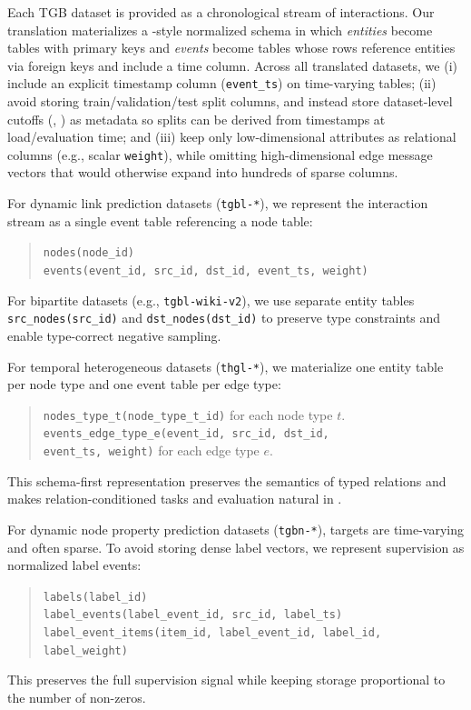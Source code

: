 Each TGB dataset is provided as a chronological stream of interactions. Our translation materializes a \relbench-style normalized schema in which \emph{entities} become tables with primary keys and \emph{events} become tables whose rows reference entities via foreign keys and include a time column. Across all translated datasets, we (i) include an explicit timestamp column (\texttt{event\_ts}) on time-varying tables; (ii) avoid storing train/validation/test split columns, and instead store dataset-level cutoffs (\valtimestamp, \testtimestamp) as metadata so splits can be derived from timestamps at load/evaluation time; and (iii) keep only low-dimensional attributes as relational columns (e.g., scalar \texttt{weight}), while omitting high-dimensional edge message vectors that would otherwise expand into hundreds of sparse columns.

For dynamic link prediction datasets (\texttt{tgbl-*}), we represent the interaction stream as a single event table referencing a node table:
\begin{quote}
  \small
  \texttt{nodes(node\_id)}\\
  \texttt{events(event\_id, src\_id, dst\_id, event\_ts, weight)}
\end{quote}
\noindent For bipartite datasets (e.g., \texttt{tgbl-wiki-v2}), we use separate entity tables \texttt{src\_nodes(src\_id)} and \texttt{dst\_nodes(dst\_id)} to preserve type constraints and enable type-correct negative sampling.

For temporal heterogeneous datasets (\texttt{thgl-*}), we materialize one entity table per node type and one event table per edge type:
\begin{quote}
  \small
  \texttt{nodes\_type\_t(node\_type\_t\_id)} for each node type \(t\).\\
  \texttt{events\_edge\_type\_e(event\_id, src\_id, dst\_id,}\\
  \texttt{event\_ts, weight)} for each edge type \(e\).
\end{quote}
\noindent This schema-first representation preserves the semantics of typed relations and makes relation-conditioned tasks and evaluation natural in \relbench.

For dynamic node property prediction datasets (\texttt{tgbn-*}), targets are time-varying and often sparse. To avoid storing dense label vectors, we represent supervision as normalized label events:
\begin{quote}
  \small
  \texttt{labels(label\_id)}\\
  \texttt{label\_events(label\_event\_id, src\_id, label\_ts)}\\
  \texttt{label\_event\_items(item\_id, label\_event\_id, label\_id,}\\
  \texttt{label\_weight)}
\end{quote}
\noindent This preserves the full supervision signal while keeping storage proportional to the number of non-zeros.

